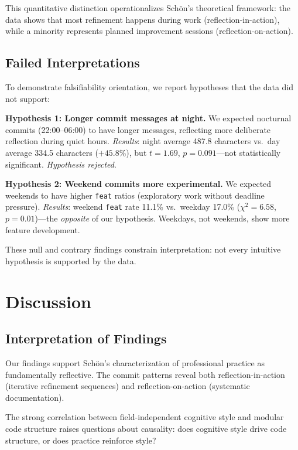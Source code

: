 \documentclass{ntlabs-preprint}
\begin{document}
This quantitative distinction operationalizes Schön's theoretical framework: the data shows that most refinement happens during work (reflection-in-action), while a minority represents planned improvement sessions (reflection-on-action).

\subsection{Failed Interpretations}

To demonstrate falsifiability orientation, we report hypotheses that the data did not support:

\textbf{Hypothesis 1: Longer commit messages at night.} We expected nocturnal commits (22:00--06:00) to have longer messages, reflecting more deliberate reflection during quiet hours. \textit{Results}: night average 487.8 characters vs.\ day average 334.5 characters ($+45.8\%$), but $t = 1.69$, $p = 0.091$---not statistically significant. \textit{Hypothesis rejected}.

\textbf{Hypothesis 2: Weekend commits more experimental.} We expected weekends to have higher \texttt{feat} ratios (exploratory work without deadline pressure). \textit{Results}: weekend \texttt{feat} rate 11.1\% vs.\ weekday 17.0\% ($\chi^2 = 6.58$, $p = 0.01$)---the \textit{opposite} of our hypothesis. Weekdays, not weekends, show more feature development.

These null and contrary findings constrain interpretation: not every intuitive hypothesis is supported by the data.

\section{Discussion}

\subsection{Interpretation of Findings}

Our findings support Schön's characterization of professional practice as fundamentally reflective. The commit patterns reveal both reflection-in-action (iterative refinement sequences) and reflection-on-action (systematic documentation).

The strong correlation between field-independent cognitive style and modular code structure raises questions about causality: does cognitive style drive code structure, or does practice reinforce style?
\end{document}
